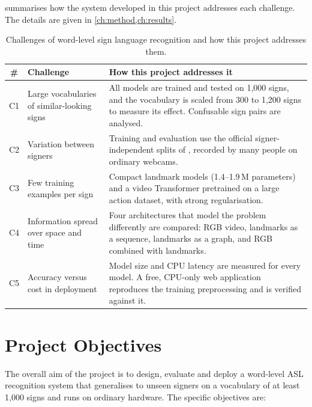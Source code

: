  summarises how the system developed in
this project addresses each challenge. The details are given in
\cref{ch:method,ch:results}.

\begin{table}[htbp]
\centering
\caption{Challenges of word-level sign language recognition and how this
project addresses them.}
\label{tab:challenges-responses}
\small
\begin{tabularx}{\linewidth}{@{}c L{4.3cm} Y@{}}
\toprule
{}
\textbf{\#} & \textbf{Challenge} & \textbf{How this project addresses it} \\
\midrule
C1 & Large vocabularies of similar-looking signs
   & All models are trained and tested on 1,000 signs, and the
     vocabulary is scaled from 300 to 1,200 signs to measure its effect.
     Confusable sign pairs are analysed. \\
C2 & Variation between signers
   & Training and evaluation use the official signer-independent splits of
     \aslc{}, recorded by many people on ordinary webcams. \\
C3 & Few training examples per sign
   & Compact landmark models (1.4--1.9\,M parameters) and a video
     Transformer pretrained on a large action dataset, with strong
     regularisation. \\
C4 & Information spread over space and time
   & Four architectures that model the problem differently are compared:
     RGB video, landmarks as a sequence, landmarks as a graph, and RGB
     combined with landmarks. \\
C5 & Accuracy versus cost in deployment
   & Model size and CPU latency are measured for every model. A free,
     CPU-only web application reproduces the training preprocessing and is
     verified against it. \\
\bottomrule
\end{tabularx}
\end{table}

\section{Project Objectives}
\label{sec:objectives}

The overall aim of the project is to design, evaluate and deploy a
word-level ASL recognition system that generalises to unseen signers on a
vocabulary of at least 1,000 signs and runs on ordinary hardware. The
specific objectives are:

